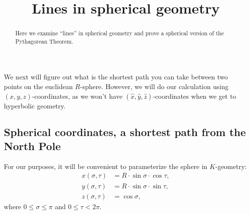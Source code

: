 \documentclass[newpage,hints,handout,noauthor,nooutcomes,12pt]{ximera}
\title{Lines in spherical geometry}
\begin{document}
\begin{abstract}
Here we examine ``lines'' in spherical geometry and prove a spherical
version of the Pythagorean Theorem.
\end{abstract}
\maketitle



We next will figure out what is the shortest path you can take between
two points on the euclidean $R$-sphere. However, we will do our
calculation using $(x,y,z)$-coordinates, as we won't have
$(\hat{x},\hat{y},\hat{z})$-coordinates when we get to hyperbolic
geometry.


\subsection{Spherical coordinates, a shortest path from the North Pole}


For our purposes, it will be convenient to parameterize the sphere in
$K$-geometry:%
\begin{align*}
x(\sigma,\tau) &=R\cdot \sin\sigma\cdot \cos \tau,\\
y(\sigma,\tau) &=R\cdot \sin\sigma\cdot \sin\tau,\\
z(\sigma,\tau) &=\cos \sigma,
\end{align*}
where $0\le \sigma\le\pi$ and $0\le \tau<2\pi$.

\begin{center}
\end{center}
\end{document}
